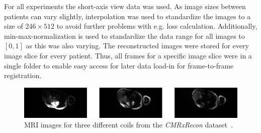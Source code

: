 \documentclass[english,version-2022-01]{uzl-thesis} %
\begin{document}
For all experiments the short-axis  view data was used. As image sizes between patients can vary slightly, interpolation was used to standardize the images to a size of $246 \times 512$ to avoid further problems with e.g. 
loss calculation. Additionally, min-max-normalization is used to standardize the data range for all images to $[0,1]$ as this was also varying. The reconstructed images were stored for every image slice for every patient. Thus, all frames for a specific image slice were in a single folder to enable easy access for later data load-in for frame-to-frame registration.

\begin{figure}[h]%
	\centering
	\graphicspath{{images/}{\main/images/}}
	\includegraphics[width=\linewidth]{CoilsHorizontal.png} 
	\caption{MRI images for three different coils from the \emph{CMRxRecon} dataset~\cite{CMRxRecon}.}
	\label{fig:Coils}
\end{figure}
\end{document}
